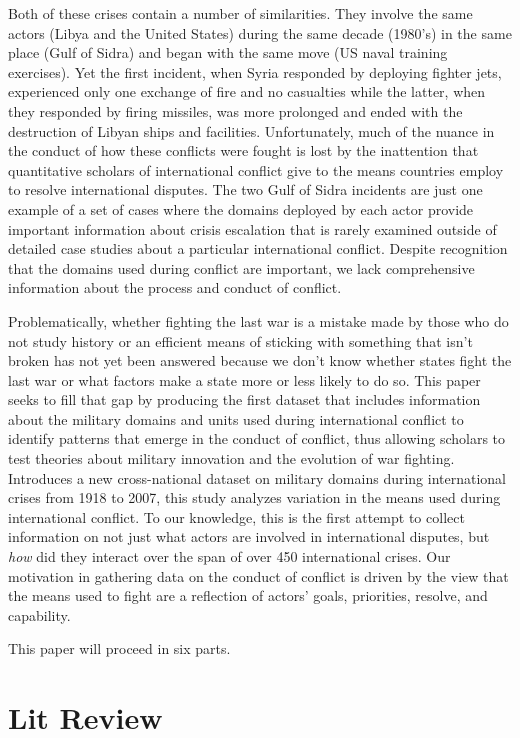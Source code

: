 \documentclass[12pt,letterpaper]{article}
\begin{document}
	Both of these crises contain a number of similarities. They involve the same actors (Libya and the United States) during the same decade (1980's) in the same place (Gulf of Sidra) and began with the same move (US naval training exercises). Yet the first incident, when Syria responded by deploying fighter jets, experienced only one exchange of fire and no casualties while the latter, when they responded by firing missiles, was more prolonged and ended with the destruction of Libyan ships and facilities. Unfortunately, much of the nuance in the conduct of how these conflicts were fought is lost by the inattention that quantitative scholars of international conflict give to the means countries employ to resolve international disputes. The two Gulf of Sidra incidents are just one example of a set of cases where the domains deployed by each actor provide important information about crisis escalation that is rarely examined outside of detailed case studies about a particular international conflict. Despite recognition that the domains used during conflict are important, we lack comprehensive information about the process and conduct of conflict.
	
	Problematically, whether fighting the last war is a mistake made by those who do not study history or an efficient means of sticking with something that isn't broken has not yet been answered because we don't know whether states fight the last war or what factors make a state more or less likely to do so. This paper seeks to fill that gap by producing the first dataset that includes information about the military domains and units used during international conflict to identify patterns that emerge in the conduct of conflict, thus allowing scholars to test theories about military innovation and the evolution of war fighting. Introduces a new cross-national dataset on military domains during international crises from 1918 to 2007, this study analyzes variation in the means used during international conflict. To our knowledge, this is the first attempt to collect information on not just what actors are involved in international disputes, but \textit{how} did they interact over the span of over 450 international crises. Our motivation in gathering data on the conduct of conflict is driven by the view that the means used to fight are a reflection of actors' goals, priorities, resolve, and capability.
	
	This paper will proceed in six parts.

\section{Lit Review}
\end{document}
